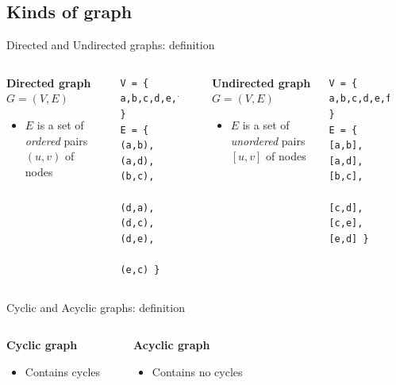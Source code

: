 \documentclass[compress]{beamer}
\begin{document}
\subsection{Kinds of graph}
\begin{frame}[fragile]{Directed and Undirected graphs: definition}
  \begin{columns}
  \begin{block}{\textbf{Directed graph} $G = (V, E)$}
    \begin{itemize}
      \item $E$ is a set of \emph{ordered} pairs $(u, v)$ of nodes
    \end{itemize}
  \end{block}
  \begin{verbatim}
V = { a,b,c,d,e,f }
E = { (a,b),(a,d),(b,c),
      (d,a),(d,c),(d,e),
      (e,c) }
  \end{verbatim}
  \begin{center}
  \scalebox{0.65}{}
  \end{center}
  \begin{block}{\textbf{Undirected graph} $G = (V, E)$}
    \begin{itemize}
      \item $E$ is a set of \emph{unordered} pairs $[u, v]$ of nodes
    \end{itemize}
  \end{block}
  \begin{verbatim}
V = { a,b,c,d,e,f }
E = { [a,b],[a,d],[b,c],
      [c,d],[c,e],[e,d] }

  \end{verbatim}
  \begin{center}
  \scalebox{0.65}{}
  \end{center}
\end{columns}
\end{frame}


\begin{frame}{Cyclic and Acyclic graphs: definition}
  \begin{columns}
    \begin{block}{\textbf{Cyclic graph}}
      \begin{itemize}
        \item Contains cycles
      \end{itemize}
    \end{block}
    \begin{center}
    
  \end{center}
    \begin{block}{\textbf{Acyclic graph}}
      \begin{itemize}
        \item Contains no cycles
      \end{itemize}
    \end{block}
    \begin{center}
    
    \end{center}
  \end{columns}
\end{frame}
\end{document}

